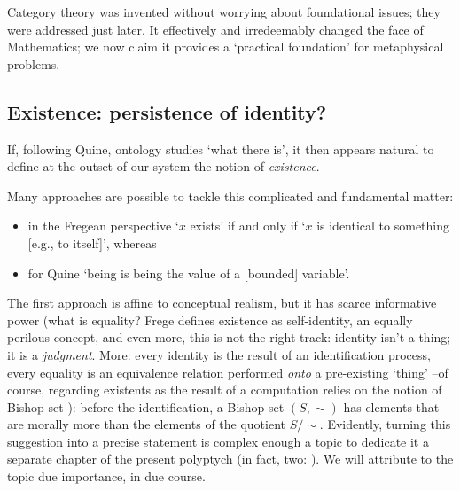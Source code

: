 Category theory was invented without worrying about foundational issues; they were addressed just later. It effectively and irredeemably changed the face of Mathematics; we now claim it provides a `practical foundation' for metaphysical problems.%
\subsection{Existence: persistence of identity?} \label{existence}
If, following Quine, ontology studies `what there is', it then appears natural to define at the outset of our system the notion of \emph{existence}.

Many approaches are possible to tackle this complicated and fundamental matter: 
\begin{itemize}
    \item in the Fregean perspective \cite{Frege} `$x$ exists' if and only if `$x$ is identical to something [e.g., to itself]', whereas 
    \item for Quine \cite{Qui53} `being is being the value of a [bounded] variable'.
\end{itemize}
The first approach is affine to conceptual realism, but it has scarce informative power (what is equality? Frege defines existence as self-identity, an equally perilous concept, and even more, this is not the right track: identity isn't a thing; it is a \emph{judgment}. More: every identity is the result of an identification process, every equality is an equivalence relation performed \emph{onto} a pre-existing `thing' --of course, regarding existents as the result of a computation relies on the notion of Bishop set \cite{Bis67,hofmann2012extensional}): before the identification, a Bishop set $(S,\sim)$ has elements that are morally more than the elements of the quotient $S/\!\sim$. Evidently, turning this suggestion into a precise statement is complex enough a topic to dedicate it a separate chapter of the present polyptych (in fact, two: \cite{black,homot}). We will attribute to the topic due importance, in due course.

